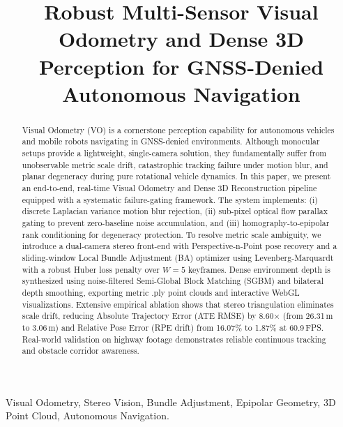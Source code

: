 \documentclass[conference]{IEEEtran}
\begin{document}
\title{Robust Multi-Sensor Visual Odometry and Dense 3D Perception for GNSS-Denied Autonomous Navigation}

\author{
}

\maketitle

\begin{abstract}
Visual Odometry (VO) is a cornerstone perception capability for autonomous vehicles and mobile robots navigating in GNSS-denied environments. Although monocular setups provide a lightweight, single-camera solution, they fundamentally suffer from unobservable metric scale drift, catastrophic tracking failure under motion blur, and planar degeneracy during pure rotational vehicle dynamics. In this paper, we present an end-to-end, real-time Visual Odometry and Dense 3D Reconstruction pipeline equipped with a systematic failure-gating framework. The system implements: (i) discrete Laplacian variance motion blur rejection, (ii) sub-pixel optical flow parallax gating to prevent zero-baseline noise accumulation, and (iii) homography-to-epipolar rank conditioning for degeneracy protection. To resolve metric scale ambiguity, we introduce a dual-camera stereo front-end with Perspective-n-Point pose recovery and a sliding-window Local Bundle Adjustment (BA) optimizer using Levenberg-Marquardt with a robust Huber loss penalty over $W=5$ keyframes. Dense environment depth is synthesized using noise-filtered Semi-Global Block Matching (SGBM) and bilateral depth smoothing, exporting metric .ply point clouds and interactive WebGL visualizations. Extensive empirical ablation shows that stereo triangulation eliminates scale drift, reducing Absolute Trajectory Error (ATE RMSE) by 8.60$\times$ (from 26.31\,m to 3.06\,m) and Relative Pose Error (RPE drift) from 16.07\% to 1.87\% at 60.9\,FPS. Real-world validation on highway footage demonstrates reliable continuous tracking and obstacle corridor awareness.
\end{abstract}

\begin{IEEEkeywords}
Visual Odometry, Stereo Vision, Bundle Adjustment, Epipolar Geometry, 3D Point Cloud, Autonomous Navigation.
\end{IEEEkeywords}
\end{document}
